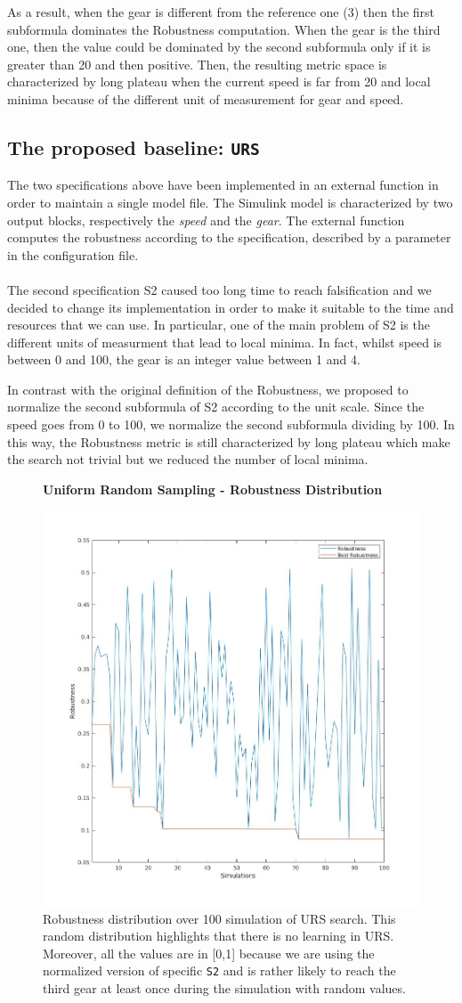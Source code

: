 \documentclass[11pt]{article}
\begin{document}
As a result, when the gear is different from the reference one (3) then the first subformula dominates the Robustness computation. When the gear is the third one, then the value could be dominated by     the second subformula only if it is greater than 20 and then positive. Then, the resulting metric space is characterized by long plateau when the current speed is far from 20 and local minima because of  the different unit of measurement for gear and speed.

\subsection{The proposed baseline: \texttt{URS}}
The two specifications above have been implemented in an external function in order to maintain a single model file. The Simulink model is characterized by two output blocks, respectively the \textit{speed} and the \textit{gear}. The external function computes the robustness according to the specification, described by a parameter in the configuration file.
\\ \\
The second specification S2 caused too long time to reach falsification and we decided to change its implementation in order to make it suitable to the time and resources that we can use. In particular, one of the main problem of S2 is the different units of measurment that lead to local minima. In fact, whilst speed is between 0 and 100, the gear is an integer value between 1 and 4.

In contrast with the original definition of the Robustness, we proposed to normalize the second subformula of S2 according to the unit scale. Since the speed goes from 0 to 100, we normalize the second subformula dividing by 100. In this way, the Robustness metric is still characterized by long plateau which make the search not trivial but we reduced the number of local minima.

\begin{figure}[h]
    \centering
    \textbf{Uniform Random Sampling - Robustness Distribution}\par
    \includegraphics[width=0.5\linewidth]{img/urs_rob_distr.jpg}
    \caption{Robustness distribution over 100 simulation of URS search. This random distribution highlights that there is no learning in URS. Moreover, all the values are in [0,1] because we are using the normalized version of specific \texttt{S2} and is rather likely to reach the third gear at least once during the simulation with random values.}
\end{figure}
\end{document}
